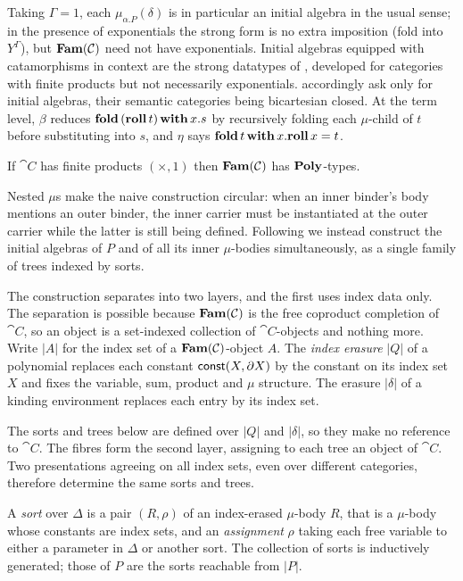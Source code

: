 Taking $\Gamma = 1$, each $\mu_{\alpha.P}(\delta)$ is in particular an initial algebra in the usual
sense; in the presence of exponentials the strong form is no extra imposition (fold into $Y^\Gamma$), but
$\mathbf{Fam}(\mathcal{C})$ need not have exponentials. Initial algebras equipped with catamorphisms in
context are the strong datatypes of \citet{cockett-spencer92}, developed for categories with finite
products but not necessarily exponentials. \citet[Definition~6]{nunes2023} accordingly ask only for
initial algebras, their semantic categories being bicartesian closed. At the term level, $\beta$ reduces
$\mathbf{fold}\,(\mathbf{roll}\,t)\,\mathbf{with}\,x.s$ by recursively folding each $\mu$-child of $t$ before
substituting into $s$, and $\eta$ says $\mathbf{fold}\,t\,\mathbf{with}\,x.\mathbf{roll}\,x = t$.

\begin{proposition}
\label{prop:polynomial-types:fam-has-poly}
If $\cat{C}$ has finite products $(\times, 1)$ then $\mathbf{Fam}(\mathcal{C})$ has $\mathbf{Poly}$-types.
\end{proposition}

Nested $\mu$s make the naive construction circular: when an inner binder's body mentions an outer binder,
the inner carrier must be instantiated at the outer carrier while the latter is still being defined.
Following \citet{abbott2004} we instead construct the initial algebras of $P$ and of all its inner
$\mu$-bodies simultaneously, as a single family of trees indexed by sorts.

The construction separates into two layers, and the first uses index data only. The separation
is possible because $\mathbf{Fam}(\mathcal{C})$ is the free coproduct completion of $\cat{C}$, so an object is a
set-indexed collection of $\cat{C}$-objects and nothing more. Write $|A|$ for the
index set of a $\mathbf{Fam}(\mathcal{C})$-object $A$. The \emph{index erasure} $|Q|$ of a polynomial replaces
each constant $\mathsf{const}(X, \partial X)$ by the constant on its index set $X$ and fixes the variable,
sum, product and $\mu$ structure. The erasure $|\delta|$ of a kinding environment replaces each entry
by its index set.

The sorts and trees below are defined over $|Q|$ and $|\delta|$, so they make no reference to
$\cat{C}$. The fibres form the second layer, assigning to each tree an object of $\cat{C}$. Two
presentations agreeing on all index sets, even over different categories, therefore determine the
same sorts and trees.

\begin{definition}[Sort]
\label{def:polynomial-types:sort}
A \emph{sort} over $\Delta$ is a pair $(R, \rho)$ of an index-erased $\mu$-body $R$, that is a
$\mu$-body whose constants are index sets, and an \emph{assignment} $\rho$ taking each free
variable to either a parameter in $\Delta$ or another sort. The collection of sorts is inductively
generated; those of $P$ are the sorts reachable from $|P|$.
\end{definition}

